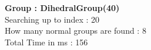\textbf{Group : DihedralGroup(40)}\\
Searching up to index : 20\\
How many normal groups are found : 8\\
Total Time in ms : 156\\
